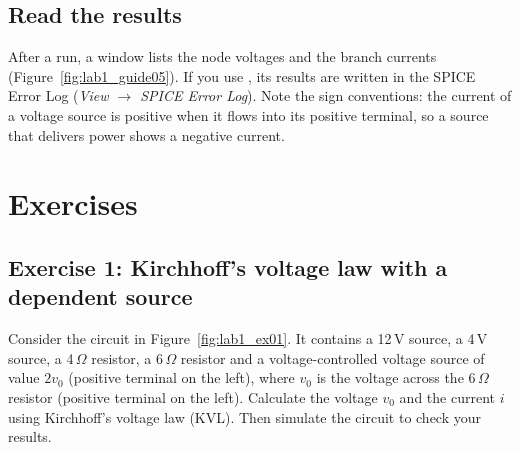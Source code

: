 \subsection{Read the results}
After a  run, a window lists the node voltages and the branch currents (Figure~\ref{fig:lab1_guide05}). If you use , its results are written in the SPICE Error Log (\textit{View $\rightarrow$ SPICE Error Log}). Note the sign conventions: the current of a voltage source is positive when it flows into its positive terminal, so a source that delivers power shows a negative current.

\section{Exercises}

\subsection{Exercise 1: Kirchhoff's voltage law with a dependent source}
Consider the circuit in Figure~\ref{fig:lab1_ex01}. It contains a 12\,V source, a 4\,V source, a 4\,$\Omega$ resistor, a 6\,$\Omega$ resistor and a voltage-controlled voltage source of value $2v_0$ (positive terminal on the left), where $v_0$ is the voltage across the 6\,$\Omega$ resistor (positive terminal on the left). Calculate the voltage $v_0$ and the current $i$ using Kirchhoff's voltage law (KVL). Then simulate the circuit to check your results.




